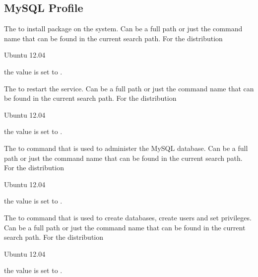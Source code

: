 \label{sec:mysql_profile}
\subsection{MySQL Profile}


The  to install package on the system. Can be a full path or
just the command name that can be found in the current search path. 
For the distribution
\begin{inparaitem}
\item[\TheDistribution{ubuntu}] Ubuntu 12.04
\end{inparaitem}
the value is set to .


The  to restart the service. Can be a full path or
just the command name that can be found in the current search path. 
For the distribution
\begin{inparaitem}
\item[\TheDistribution{ubuntu}] Ubuntu 12.04
\end{inparaitem}
the value is set to .


The  to  command that is used to administer the 
MySQL database. Can be a full path or
just the command name that can be found in the current search path. 
For the distribution
\begin{inparaitem}
\item[\TheDistribution{ubuntu}] Ubuntu 12.04
\end{inparaitem}
the value is set to .


The  to  command that is used to create databases,
create users and set privileges. Can be a full path or
just the command name that can be found in the current search path. 
For the distribution
\begin{inparaitem}
\item[\TheDistribution{ubuntu}] Ubuntu 12.04
\end{inparaitem}
the value is set to .


